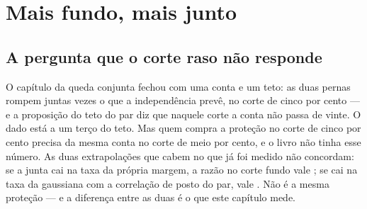 
\chapter{Mais fundo, mais junto}\label{cap:fundo}

\section{A pergunta que o corte raso não responde}

O capítulo da queda conjunta fechou com uma conta e um teto: as duas pernas rompem juntas
\numConjuntaExcesso{} vezes o que a independência prevê, no corte de cinco por cento --- e a
proposição do teto do par diz que naquele corte a conta não passa de vinte. O dado está a um terço
do teto. Mas quem compra a proteção no corte de cinco por cento precisa da mesma conta no corte de
meio por cento, e o livro não tinha esse número. As duas extrapolações que cabem no que já foi
medido não concordam: se a junta cai na taxa da própria margem, a razão no corte fundo vale
\numFundoPromessaProporcional; se cai na taxa da gaussiana com a correlação de posto do par, vale
\numFundoPromessaGaussiana. Não é a mesma proteção --- e a diferença entre as duas é o que este
capítulo mede.


